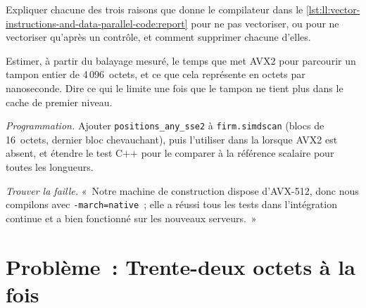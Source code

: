\begin{exercise}[$\star\star$]\label{exo:ll:vector-instructions-and-data-parallel-code:5}
Expliquer chacune des trois raisons que donne le compilateur dans le \cref{lst:ll:vector-instructions-and-data-parallel-code:report}
pour ne pas vectoriser, ou pour ne vectoriser qu'après un contrôle, et comment supprimer chacune d'elles.
\end{exercise}

\begin{exercise}[$\star\star$]\label{exo:ll:vector-instructions-and-data-parallel-code:6}
Estimer, à partir du balayage mesuré, le temps que met AVX2 pour parcourir un tampon entier de 4\,096~octets, et ce que cela
représente en octets par nanoseconde. Dire ce qui le limite une fois que le tampon ne tient plus dans le cache de premier niveau.
\end{exercise}

\begin{exercise}[$\star\star\star$]\label{exo:ll:vector-instructions-and-data-parallel-code:7}
\emph{Programmation.} Ajouter \texttt{positions\_any\_sse2} à \texttt{firm.simdscan} (blocs de 16~octets, dernier bloc chevauchant), puis
l'utiliser dans la  lorsque AVX2 est absent, et étendre le test C++ pour le comparer à la référence scalaire pour toutes les longueurs.
\end{exercise}

\begin{exercise}[$\star\star\star$]\label{exo:ll:vector-instructions-and-data-parallel-code:8}
\emph{Trouver la faille.} «~Notre machine de construction dispose d'AVX-512, donc nous compilons avec \texttt{-march=native}~; elle a réussi tous les tests dans
l'intégration continue et a bien fonctionné sur les nouveaux serveurs.~»
\end{exercise}

\section{Problème~: Trente-deux octets à la fois}


